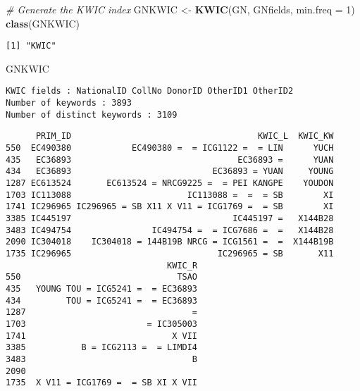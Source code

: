 \documentclass[]{article}
\newenvironment{Shaded}{\begin{snugshade}}{\end{snugshade}}
\newcommand{\CommentTok}[1]{\textcolor[rgb]{0.56,0.35,0.01}{\textit{#1}}}
\newcommand{\DataTypeTok}[1]{\textcolor[rgb]{0.13,0.29,0.53}{#1}}
\newcommand{\DecValTok}[1]{\textcolor[rgb]{0.00,0.00,0.81}{#1}}
\newcommand{\KeywordTok}[1]{\textcolor[rgb]{0.13,0.29,0.53}{\textbf{#1}}}
\newcommand{\NormalTok}[1]{#1}
\newcommand{\OperatorTok}[1]{\textcolor[rgb]{0.81,0.36,0.00}{\textbf{#1}}}
\newcommand{\OtherTok}[1]{\textcolor[rgb]{0.56,0.35,0.01}{#1}}
\newcommand{\StringTok}[1]{\textcolor[rgb]{0.31,0.60,0.02}{#1}}
\begin{document}
\begin{Shaded}
\begin{Highlighting}[]
\CommentTok{# Generate the KWIC index}
\NormalTok{GNKWIC <-}\StringTok{ }\KeywordTok{KWIC}\NormalTok{(GN, GNfields, }\DataTypeTok{min.freq =} \DecValTok{1}\NormalTok{)}
\KeywordTok{class}\NormalTok{(GNKWIC)}
\end{Highlighting}
\end{Shaded}

\begin{verbatim}
[1] "KWIC"
\end{verbatim}

\begin{Shaded}
\begin{Highlighting}[]
\NormalTok{GNKWIC}
\end{Highlighting}
\end{Shaded}

\begin{verbatim}
KWIC fields : NationalID CollNo DonorID OtherID1 OtherID2
Number of keywords : 3893
Number of distinct keywords : 3109
\end{verbatim}

\begin{Shaded}
\end{Shaded}

\begin{verbatim}
      PRIM_ID                                     KWIC_L  KWIC_KW
550  EC490380            EC490380 =  = ICG1122 =  = LIN      YUCH
435   EC36893                                 EC36893 =      YUAN
434   EC36893                            EC36893 = YUAN     YOUNG
1287 EC613524       EC613524 = NRCG9225 =  = PEI KANGPE    YOUDON
1703 IC113088                       IC113088 =  =  = SB        XI
1741 IC296965 IC296965 = SB X11 X V11 = ICG1769 =  = SB        XI
3385 IC445197                                IC445197 =   X144B28
3483 IC494754                IC494754 =  = ICG7686 =  =   X144B28
2090 IC304018    IC304018 = 144B19B NRCG = ICG1561 =  =  X144B19B
1735 IC296965                             IC296965 = SB       X11
                                KWIC_R
550                               TSAO
435   YOUNG TOU = ICG5241 =  = EC36893
434         TOU = ICG5241 =  = EC36893
1287                                 =
1703                        = IC305003
1741                             X VII
3385           B = ICG2113 =  = LIMDI4
3483                                 B
2090                                  
1735  X V11 = ICG1769 =  = SB XI X VII
\end{verbatim}
\end{document}
